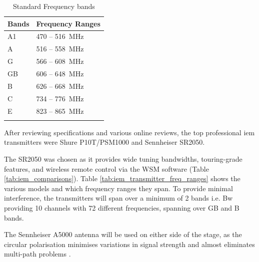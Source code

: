             \begin{longtable}[H]{|l|l|}
                \hline
                \textbf{Bands} & \textbf{Frequency   Ranges} \\ \hline
                \endfirsthead
                \endhead
                A1             & \SI{470}{} – \SI{516}{\MHz}               \\ \hline
                A              & \SI{516}{} – \SI{558}{\MHz}               \\ \hline
                G              & \SI{566}{} – \SI{608}{\MHz}               \\ \hline
                GB             & \SI{606}{} – \SI{648}{\MHz}               \\ \hline
                B              & \SI{626}{} – \SI{668}{\MHz}               \\ \hline
                C              & \SI{734}{} – \SI{776}{\MHz}               \\ \hline
                E              & \SI{823}{} – \SI{865}{\MHz}               \\ \hline
                \caption{Standard Frequency bands}
                \label{tab:frequency_band_licensing}
            \end{longtable}

            After reviewing specifications and various online reviews, the top professional \gls{iem} transmitters were Shure P10T/PSM1000 and Sennheiser SR2050.
            
            The SR2050 was chosen as it provides wide tuning bandwidths, touring-grade features, and wireless remote control via the WSM software (Table \ref{tab:iem_comparisons}). Table \ref{tab:iem_transmitter_freq_ranges} shows the various models and which frequency ranges they span. To provide minimal interference, the transmitters will span over a minimum of 2 bands i.e. Bw providing 10 channels with 72 different frequencies, spanning over GB and B bands.
            
            The Sennheiser A5000 antenna will be used on either side of the stage, as the circular polarisation minimises variations in signal strength and almost eliminates multi-path problems \citep{sennheiser-a5000}.


